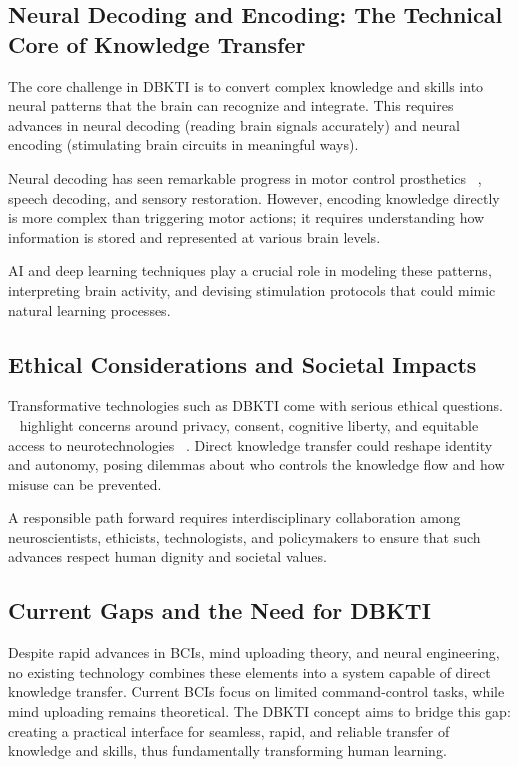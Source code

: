 \documentclass[12pt]{article}
\begin{document}
\subsection{Neural Decoding and Encoding: The Technical Core of Knowledge Transfer}
The core challenge in DBKTI is to convert complex knowledge and skills into neural patterns that the brain can recognize and integrate. This requires advances in neural decoding (reading brain signals accurately) and neural encoding (stimulating brain circuits in meaningful ways).

Neural decoding has seen remarkable progress in motor control prosthetics ~\cite{hochberg2006neuronal}, speech decoding, and sensory restoration. However, encoding knowledge directly is more complex than triggering motor actions; it requires understanding how information is stored and represented at various brain levels.

AI and deep learning techniques play a crucial role in modeling these patterns, interpreting brain activity, and devising stimulation protocols that could mimic natural learning processes.
\subsection{Ethical Considerations and Societal Impacts}
Transformative technologies such as DBKTI come with serious ethical questions. ~\cite{yuste2017four} highlight concerns around privacy, consent, cognitive liberty, and equitable access to neurotechnologies ~\cite{yuste2017four}. Direct knowledge transfer could reshape identity and autonomy, posing dilemmas about who controls the knowledge flow and how misuse can be prevented.

A responsible path forward requires interdisciplinary collaboration among neuroscientists, ethicists, technologists, and policymakers to ensure that such advances respect human dignity and societal values.

\subsection{Current Gaps and the Need for DBKTI} 
Despite rapid advances in BCIs, mind uploading theory, and neural engineering, no existing technology combines these elements into a system capable of direct knowledge transfer. Current BCIs focus on limited command-control tasks, while mind uploading remains theoretical. The DBKTI concept aims to bridge this gap: creating a practical interface for seamless, rapid, and reliable transfer of knowledge and skills, thus fundamentally transforming human learning.
\end{document}
